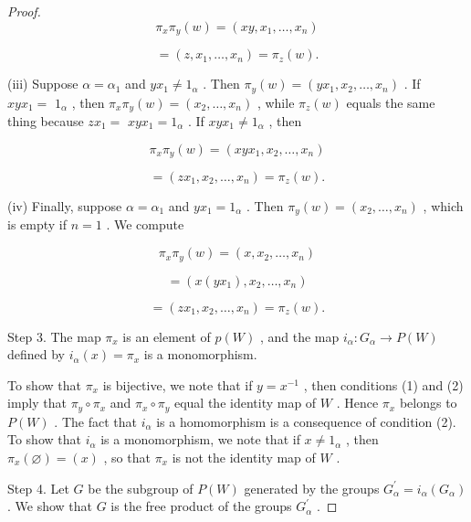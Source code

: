 \begin{proof}
\[
{\pi }_{x}{\pi }_{y}\left( w\right)  = \left( {{xy},{x}_{1},\ldots ,{x}_{n}}\right)
\]

\[
= \left( {z,{x}_{1},\ldots ,{x}_{n}}\right)  = {\pi }_{z}\left( w\right) .
\]

(iii) Suppose \(\alpha  = {\alpha }_{1}\) and \(y{x}_{1} \neq  {1}_{\alpha }\) . Then \({\pi }_{y}\left( w\right)  = \left( {y{x}_{1},{x}_{2},\ldots ,{x}_{n}}\right)\) . If \({xy}{x}_{1} =\)  \({1}_{\alpha }\) , then \({\pi }_{x}{\pi }_{y}\left( w\right)  = \left( {{x}_{2},\ldots ,{x}_{n}}\right)\) , while \({\pi }_{z}\left( w\right)\) equals the same thing because \(z{x}_{1} =\)  \({xy}{x}_{1} = {1}_{\alpha }\) . If \({xy}{x}_{1} \neq  {1}_{\alpha }\) , then

\[
{\pi }_{x}{\pi }_{y}\left( w\right)  = \left( {{xy}{x}_{1},{x}_{2},\ldots ,{x}_{n}}\right)
\]

\[
= \left( {z{x}_{1},{x}_{2},\ldots ,{x}_{n}}\right)  = {\pi }_{z}\left( w\right) .
\]

(iv) Finally, suppose \(\alpha  = {\alpha }_{1}\) and \(y{x}_{1} = {1}_{\alpha }\) . Then \({\pi }_{y}\left( w\right)  = \left( {{x}_{2},\ldots ,{x}_{n}}\right)\) , which is empty if \(n = 1\) . We compute

\[
{\pi }_{x}{\pi }_{y}\left( w\right)  = \left( {x,{x}_{2},\ldots ,{x}_{n}}\right)
\]

\[
= \left( {x\left( {y{x}_{1}}\right) ,{x}_{2},\ldots ,{x}_{n}}\right)
\]

\[
= \left( {z{x}_{1},{x}_{2},\ldots ,{x}_{n}}\right)  = {\pi }_{z}\left( w\right) .
\]

Step 3. The map \({\pi }_{x}\) is an element of \(p\left( W\right)\) , and the map \({i}_{\alpha } : {G}_{\alpha } \rightarrow  P\left( W\right)\) defined by \({i}_{\alpha }\left( x\right)  = {\pi }_{x}\) is a monomorphism.

To show that \({\pi }_{x}\) is bijective, we note that if \(y = {x}^{-1}\) , then conditions (1) and (2) imply that \({\pi }_{y} \circ  {\pi }_{x}\) and \({\pi }_{x} \circ  {\pi }_{y}\) equal the identity map of \(W\) . Hence \({\pi }_{x}\) belongs to \(P\left( W\right)\) . The fact that \({i}_{\alpha }\) is a homomorphism is a consequence of condition (2). To show that \({i}_{\alpha }\) is a monomorphism, we note that if \(x \neq  {1}_{\alpha }\) , then \({\pi }_{x}\left( \varnothing \right)  = \left( x\right)\) , so that \({\pi }_{x}\) is not the identity map of \(W\) .

Step 4. Let \(G\) be the subgroup of \(P\left( W\right)\) generated by the groups \({G}_{\alpha }^{\prime } = {i}_{\alpha }\left( {G}_{\alpha }\right)\) . We show that \(G\) is the free product of the groups \({G}_{\alpha }^{\prime }\) .


\end{proof}
